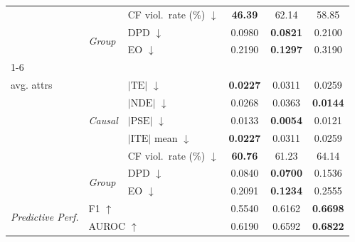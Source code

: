 \begin{table}[t]
\begin{tabular}{@{}lll ccc@{}}
  & & CF viol.\ rate (\%) $\downarrow$ & \textbf{46.39} & 62.14 & 58.85 \\
  & \multirow{2}{*}{\scriptsize\textit{Group}} & DPD $\downarrow$ & 0.0980 & \textbf{0.0821} & 0.2100 \\
  & & EO $\downarrow$ & 0.2190 & \textbf{0.1297} & 0.3190 \\
\cmidrule(lr){1-6}
  \multirow{7}{*}{\makecell[l]{\textit{Overall}\\[-2pt]\scriptsize avg. attrs}} & \multirow{5}{*}{\scriptsize\textit{Causal}} & $|\mathrm{TE}|$ $\downarrow$ & \textbf{0.0227} & 0.0311 & 0.0259 \\
  & & $|\mathrm{NDE}|$ $\downarrow$ & 0.0268 & 0.0363 & \textbf{0.0144} \\
  & & $|\mathrm{PSE}|$ $\downarrow$ & 0.0133 & \textbf{0.0054} & 0.0121 \\
  & & $|\mathrm{ITE}|$ mean $\downarrow$ & \textbf{0.0227} & 0.0311 & 0.0259 \\
  & & CF viol.\ rate (\%) $\downarrow$ & \textbf{60.76} & 61.23 & 64.14 \\
  & \multirow{2}{*}{\scriptsize\textit{Group}} & DPD $\downarrow$ & 0.0840 & \textbf{0.0700} & 0.1536 \\
  & & EO $\downarrow$ & 0.2091 & \textbf{0.1234} & 0.2555 \\
\midrule
\multirow{2}{*}{\textit{Predictive Perf.}} & \multicolumn{2}{l}{F1 $\uparrow$} & 0.5540 & 0.6162 & \textbf{0.6698} \\
  & \multicolumn{2}{l}{AUROC $\uparrow$} & 0.6190 & 0.6592 & \textbf{0.6822} \\
\bottomrule
\end{tabular}
\end{table}
